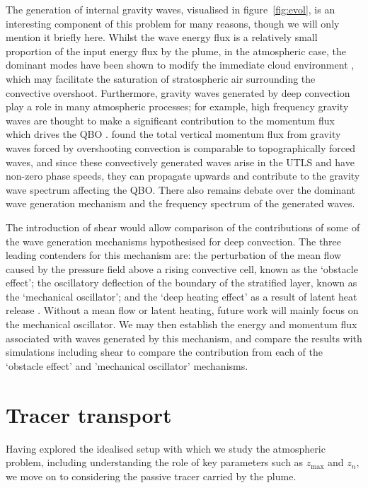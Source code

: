 \documentclass[a4paper]{article}
\begin{document}
The generation of internal gravity waves, visualised in figure~\ref{fig:evol}, is an interesting
component of this problem for many reasons, though we will only mention it briefly here. Whilst the wave
energy flux is a relatively small proportion of the input energy flux by the plume, in the atmospheric case,
the dominant modes have been shown to modify the immediate cloud environment \citep{lane2001}, which may
facilitate the saturation of stratospheric air surrounding the convective overshoot. Furthermore, gravity
waves generated by deep convection play a role in many atmospheric processes; for example, high frequency
gravity waves are thought to make a significant contribution to the momentum flux which drives the QBO
\citep{baldwin2001}. \citet{flynn2004} found the total vertical momentum flux from gravity waves forced by
overshooting convection is comparable to topographically forced waves, and since these convectively generated
waves arise in the UTLS and have non-zero phase speeds, they can propagate upwards and contribute to the
gravity wave spectrum affecting the QBO. There also remains debate over the dominant wave generation mechanism
and the frequency spectrum of the generated waves. 

The introduction of shear would allow comparison of the contributions of some of the 
wave generation mechanisms hypothesised for deep convection. The three leading contenders for this 
mechanism are: the perturbation of the mean flow caused by the pressure field above a rising convective cell,
known as the `obstacle effect'; the oscillatory deflection of the boundary of the stratified layer, known as
the `mechanical oscillator'; and the `deep heating effect' as a result of latent heat release
\citep{flynn2004}. Without a mean flow or latent heating, future work will mainly focus on the mechanical
oscillator.  We may then establish the energy and momentum flux associated with waves generated by this
mechanism, and compare the results with simulations including shear to compare the contribution from each of
the `obstacle effect' and 'mechanical oscillator' mechanisms.


\section{Tracer transport}
\label{sec:tracertransport}
Having explored the idealised setup with which we study the atmospheric problem, including understanding the
role of key parameters such as $z_{\max}$ and $z_n$, we move on to considering the passive tracer carried by
the plume. 
\end{document}
